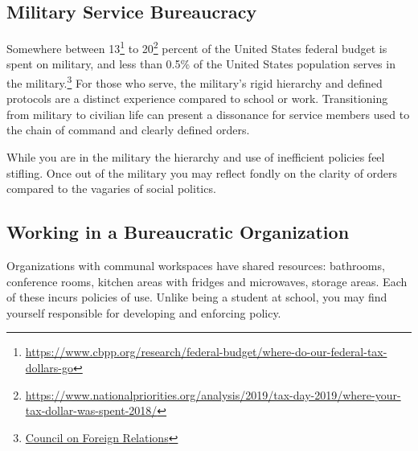 \subsection*{Military Service Bureaucracy\label{bureaucracy-of-military}}
Somewhere between 13\footnote{\href{https://www.cbpp.org/research/federal-budget/where-do-our-federal-tax-dollars-go}{https://www.cbpp.org/research/federal-budget/where-do-our-federal-tax-dollars-go}} to 20\footnote{\href{https://www.nationalpriorities.org/analysis/2019/tax-day-2019/where-your-tax-dollar-was-spent-2018/}{https://www.nationalpriorities.org/analysis/2019/tax-day-2019/where-your-tax-dollar-was-spent-2018/}} percent of the United States federal budget is spent on military, and 
less than 0.5\% of the United States population serves in the military.\footnote{\href{https://www.cfr.org/backgrounder/demographics-us-military}{Council on Foreign Relations}}
For those who serve, the military's rigid hierarchy and defined protocols are a distinct experience compared to school or work. Transitioning from military to civilian life can present a dissonance for service members used to the chain of command and clearly defined orders. 

While you are in the military the hierarchy and use of inefficient policies feel stifling. Once out of the military you may reflect fondly on the clarity of orders compared to the vagaries of social politics.  

\subsection*{Working in a Bureaucratic Organization\label{sec:bureaucracy-of-work}}



Organizations with communal workspaces have \glspl{shared resource}: bathrooms, conference rooms, kitchen areas with fridges and microwaves, storage areas. Each of these incurs policies of use. Unlike being a student at school, you may find yourself responsible for developing and enforcing policy. 

